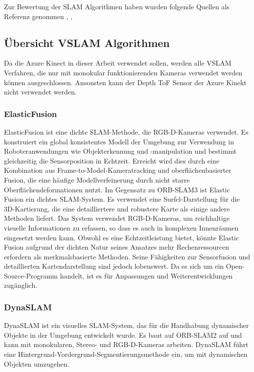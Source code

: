Zur Bewertung der \ac{SLAM} Algorithmen haben wurden folgende Quellen als Referenz genommen \cite{ragot:hal-04071273}, \cite{Merzlyakov2021}, \cite{9440682}

\subsection{Übersicht VSLAM Algorithmen}\label{chp:übersicht-slamalgo}

Da die Azure Kinect in dieser Arbeit verwendet sollen, werden alle \ac{VSLAM} Verfahren, die nur mit monokular funktionierenden Kameras verwendet werden können ausgeschlossen.
Ansonsten kann der Depth \ac{ToF} Sensor der Azure Kinekt nicht verwendet werden.

\subsubsection{ElasticFusion}


ElasticFusion ist eine dichte SLAM-Methode, die RGB-D-Kameras verwendet. Es konstruiert ein global konsistentes Modell der Umgebung zur Verwendung in Roboteranwendungen wie Objekterkennung und -manipulation und bestimmt gleichzeitig die Sensorposition in Echtzeit. Erreicht wird dies durch eine Kombination aus Frame-to-Model-Kameratracking und oberflächenbasierter Fusion, die eine häufige Modellverfeinerung durch nicht starre Oberflächendeformationen nutzt. 
Im Gegensatz zu ORB-SLAM3 ist Elastic Fusion ein dichtes SLAM-System. Es verwendet eine Surfel-Darstellung für die 3D-Kartierung, die eine detailliertere und robustere Karte als einige andere Methoden liefert. Das System verwendet RGB-D-Kameras, um reichhaltige visuelle Informationen zu erfassen, so dass es auch in komplexen Innenräumen eingesetzt werden kann. Obwohl es eine Echtzeitleistung bietet, könnte Elastic Fusion aufgrund der dichten Natur seines Ansatzes mehr Rechenressourcen erfordern als merkmalsbasierte Methoden. Seine Fähigkeiten zur Sensorfusion und detaillierten Kartendarstellung sind jedoch lobenswert. Da es sich um ein Open-Source-Programm handelt, ist es für Anpassungen und Weiterentwicklungen zugänglich.

\cite{elasticfusion}
\subsubsection{DynaSLAM}

DynaSLAM ist ein visuelles SLAM-System, das für die Handhabung dynamischer Objekte in der Umgebung entwickelt wurde. Es baut auf ORB-SLAM2 auf und kann mit monokularen, Stereo- und RGB-D-Kameras arbeiten. DynaSLAM führt eine Hintergrund-Vordergrund-Segmentierungsmethode ein, um mit dynamischen Objekten umzugehen.

